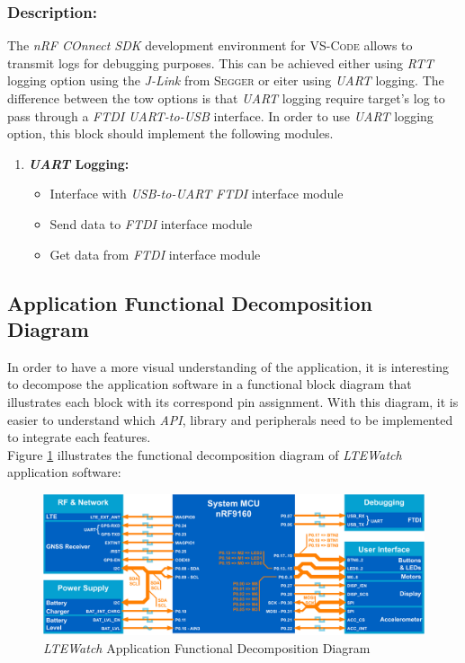 \documentclass[report.tex]{subfiles}
\begin{document}
\subsubsection{Description:}
The \textit{nRF COnnect SDK} development environment for \textsc{VS-Code} allows to transmit logs for debugging purposes. This can be achieved either using \textit{RTT} logging option using the \textit{J-Link} from \textsc{Segger} or eiter using \textit{UART} logging. The difference between the tow options is that \textit{UART} logging require target's log to pass through a \textit{FTDI} \textit{UART-to-USB} interface. In order to use \textit{UART} logging option, this block should implement the following modules.
\begin{enumerate}
\item \textbf{\textit{UART} Logging:}
\begin{itemize}
\item Interface with \textit{USB-to-UART} \textit{FTDI} interface module
\item Send data to \textit{FTDI} interface module
\item Get data from \textit{FTDI} interface module
\end{itemize}
\end{enumerate}

\pagebreak

\subsection{Application Functional Decomposition Diagram}

In order to have a more visual understanding of the application, it is interesting to decompose the application software in a functional block diagram that illustrates each block with its correspond pin assignment. With this diagram, it is easier to understand which \textit{API}, library and peripherals need to be implemented to integrate each features. \\

Figure \ref{fig:software_diag} illustrates the functional decomposition diagram of \textit{LTEWatch} application software:

\begin{figure}[H]
	\centering
	\includegraphics[width=1\textwidth]{Include/Figure/software/software_diag.pdf}
	\caption{\textit{LTEWatch} Application Functional Decomposition Diagram}
	\label{fig:software_diag}
\end{figure}
\end{document}
